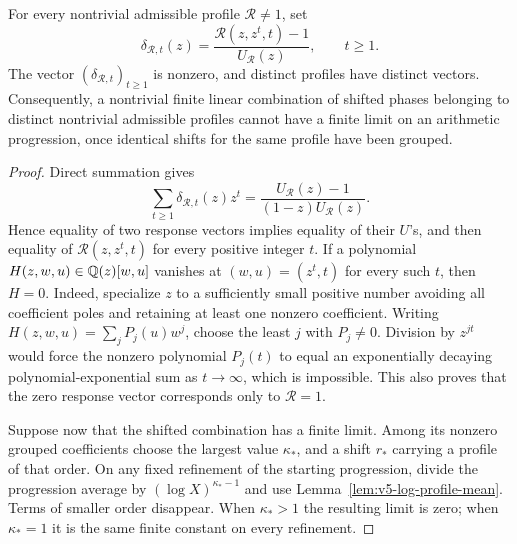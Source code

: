 \begin{lemma}
\label{lem:v5-log-separation}
For every nontrivial admissible profile $\mathcal R\ne1$, set
\[
 \delta_{\mathcal R,t}(z)
   =\frac{\mathcal R(z,z^t,t)-1}{U_{\mathcal R}(z)},\qquad t\geq1.
\]
The vector $(\delta_{\mathcal R,t})_{t\geq1}$ is nonzero, and distinct
profiles have distinct vectors. Consequently, a nontrivial finite linear
combination of shifted phases belonging to distinct nontrivial admissible
profiles cannot have a finite limit on an arithmetic progression, once
identical shifts for the same profile have been grouped.
\end{lemma}
\begin{proof}
Direct summation gives
\[
 \sum_{t\geq1}\delta_{\mathcal R,t}(z)z^t
       =\frac{U_{\mathcal R}(z)-1}{(1-z)U_{\mathcal R}(z)}.
\]
Hence equality of two response vectors implies equality of their $U$'s,
and then equality of $\mathcal R(z,z^t,t)$ for every positive integer $t$.
If a polynomial $H(z,w,u)\in\mathbb Q(z)[w,u]$ vanishes at
$(w,u)=(z^t,t)$ for every such $t$, then $H=0$.
Indeed, specialize $z$ to a sufficiently small positive number avoiding
all coefficient poles and retaining at least one nonzero coefficient.
Writing $H(z,w,u)=\sum_j P_j(u)w^j$, choose the least $j$ with
$P_j\ne0$. Division by $z^{jt}$ would force the nonzero polynomial
$P_j(t)$ to equal an exponentially decaying polynomial-exponential sum
as $t\to\infty$, which is impossible. This also proves that the zero
response vector corresponds only to $\mathcal R=1$.

Suppose now that the shifted combination has a finite limit. Among its
nonzero grouped coefficients choose the largest value $\kappa_*$, and a
shift $r_*$ carrying a profile of that order. On any fixed refinement of
the starting progression, divide the progression average by
$(\log X)^{\kappa_*-1}$ and use
Lemma~\ref{lem:v5-log-profile-mean}. Terms of smaller order disappear.
When $\kappa_*>1$ the resulting limit is zero; when $\kappa_*=1$ it is the
same finite constant on every refinement.


\end{proof}
